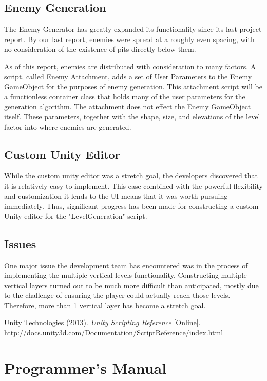 \documentclass[pdftex,12pt,letter]{article}
\begin{document}
\begin{itemize}
\begin{itemize}
\begin{itemize}
\begin{itemize}
\subsection{Enemy Generation}
The Enemy Generator has greatly expanded its functionality since its last project report. By our last report, enemies were spread at a roughly even spacing, with no consideration of the existence of pits directly below them. 

As of this report, enemies are distributed with consideration to many factors. A script, called Enemy Attachment, adds a set of User Parameters to the Enemy GameObject for the purposes of enemy generation. This attachment script will be a functionless container class that holds many of the user parameters for the generation algorithm. The attachment does not effect the Enemy GameObject itself. These parameters, together with the shape, size, and elevations of the level factor into where enemies are generated.

\subsection{Custom Unity Editor}
While the custom unity editor was a stretch goal, the developers discovered that it is relatively easy to implement. This ease combined with the powerful flexibility and customization it lends to the UI means that it was worth pursuing immediately. Thus, significant progress has been made for constructing a custom Unity editor for the "LevelGeneration" script.
\subsection{Issues}
One major issue the development team has encountered was in the process of implementing the multiple vertical levels functionality. Constructing multiple vertical layers turned out to be much more difficult than anticipated, mostly due to the challenge of ensuring the player could actually reach those levels. Therefore, more than 1 vertical layer has become a stretch goal.

\begin{thebibliography}{3}
Unity Technologies (2013). \textit{Unity Scripting Reference} [Online]. \url{http://docs.unity3d.com/Documentation/ScriptReference/index.html}
\end{thebibliography}

\appendix
\section{Programmer's Manual}

\end{itemize}
\end{itemize}
\end{itemize}
\end{itemize}
\end{document}
